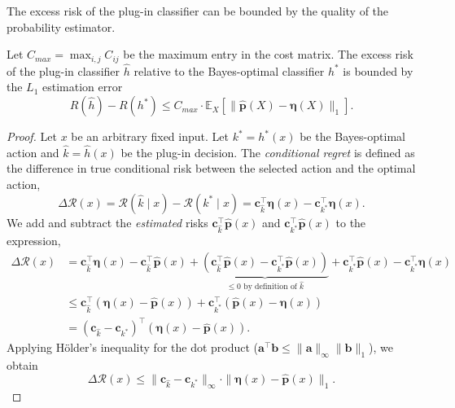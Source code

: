 The excess risk of the plug-in classifier can be bounded by the quality of the probability estimator.

\begin{proposition}\label{prop:excess_risk_bound}
Let $C_{max} = \max_{i,j} C_{ij}$ be the maximum entry in the cost matrix. The excess risk of the plug-in classifier $\hat{h}$ relative to the Bayes-optimal classifier $h^*$ is bounded by the $L_1$ estimation error
\begin{equation}
    R(\hat{h}) - R(h^*) \leq C_{max} \cdot \mathbb{E}_X \left[ \|\hat{\mathbf{p}}(X) - \boldsymbol{\eta}(X)\|_1 \right].
\end{equation}
\end{proposition}

\begin{proof}
Let $x$ be an arbitrary fixed input. Let $k^* = h^*(x)$ be the Bayes-optimal action and $\hat{k} = \hat{h}(x)$ be the plug-in decision.
The \emph{conditional regret} is defined as the difference in true conditional risk between the selected action and the optimal action,
\begin{equation}
    \Delta \mathcal{R}(x) = \mathcal{R}(\hat{k} \mid x) - \mathcal{R}(k^* \mid x) = \mathbf{c}_{\hat{k}}^\top \boldsymbol{\eta}(x) - \mathbf{c}_{k^*}^\top \boldsymbol{\eta}(x).
\end{equation}
We add and subtract the \textit{estimated} risks $\mathbf{c}_{\hat{k}}^\top \hat{\mathbf{p}}(x)$ and $\mathbf{c}_{k^*}^\top \hat{\mathbf{p}}(x)$ to the expression,
\begin{align}
    \Delta \mathcal{R}(x) &= \mathbf{c}_{\hat{k}}^\top \boldsymbol{\eta}(x) - \mathbf{c}_{\hat{k}}^\top \hat{\mathbf{p}}(x) + \underbrace{\left( \mathbf{c}_{\hat{k}}^\top \hat{\mathbf{p}}(x) - \mathbf{c}_{k^*}^\top \hat{\mathbf{p}}(x) \right)}_{\leq 0 \text{ by definition of } \hat{k}} + \mathbf{c}_{k^*}^\top \hat{\mathbf{p}}(x) - \mathbf{c}_{k^*}^\top \boldsymbol{\eta}(x) \\
    &\leq \mathbf{c}_{\hat{k}}^\top (\boldsymbol{\eta}(x) - \hat{\mathbf{p}}(x)) + \mathbf{c}_{k^*}^\top (\hat{\mathbf{p}}(x) - \boldsymbol{\eta}(x)) \\
    &= (\mathbf{c}_{\hat{k}} - \mathbf{c}_{k^*})^\top (\boldsymbol{\eta}(x) - \hat{\mathbf{p}}(x)).
\end{align}
Applying Hölder's inequality for the dot product ($\mathbf{a}^\top \mathbf{b} \leq \|\mathbf{a}\|_\infty \|\mathbf{b}\|_1$), we obtain
\begin{equation}
    \Delta \mathcal{R}(x) \leq \|\mathbf{c}_{\hat{k}} - \mathbf{c}_{k^*}\|_\infty \cdot \|\boldsymbol{\eta}(x) - \hat{\mathbf{p}}(x)\|_1.

\end{equation}
\end{proof}
